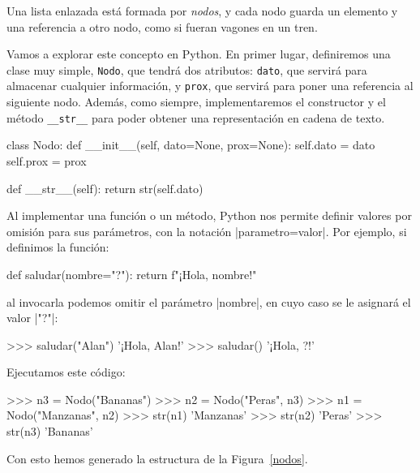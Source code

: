 Una lista enlazada está formada por \emph{nodos}, y cada nodo guarda
un elemento y una referencia a otro nodo, como si fueran vagones en un tren.

Vamos a explorar este concepto en Python.
En primer lugar, definiremos una clase muy simple, \lstinline!Nodo!, que
tendrá dos atributos: \lstinline!dato!, que
servirá para almacenar cualquier información, y \lstinline!prox!, que servirá
para poner una referencia al siguiente nodo.
Además, como siempre, implementaremos el constructor y el método
\lstinline!__str__! para poder obtener una representación en cadena de texto.

\begin{codigo-python-sn}
class Nodo:
    def __init__(self, dato=None, prox=None):
        self.dato = dato
        self.prox = prox

    def __str__(self):
        return str(self.dato)
\end{codigo-python-sn}

\begin{sabias_que}
Al implementar una función o un método, Python nos permite definir valores por
omisión para sus parámetros, con la notación |parametro=valor|. Por ejemplo, si
definimos la función:

\begin{codigo-python-sn}
def saludar(nombre="?"):
    return f"¡Hola, {nombre}!"
\end{codigo-python-sn}

\noindent al invocarla podemos omitir el parámetro |nombre|, en cuyo caso se le
asignará el valor |"?"|:

\begin{codigo-python-sn}
>>> saludar("Alan")
'¡Hola, Alan!'
>>> saludar()
'¡Hola, ?!'
\end{codigo-python-sn}
\end{sabias_que}

Ejecutamos este código:

\begin{codigo-python-sn}
>>> n3 = Nodo("Bananas")
>>> n2 = Nodo("Peras", n3)
>>> n1 = Nodo("Manzanas", n2)
>>> str(n1)
'Manzanas'
>>> str(n2)
'Peras'
>>> str(n3)
'Bananas'
\end{codigo-python-sn}

Con esto hemos generado la estructura de la Figura~\ref{nodos}.

